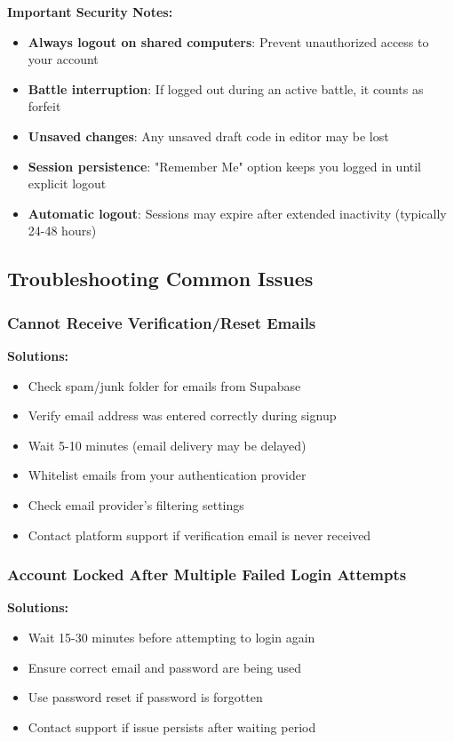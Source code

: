 \documentclass[12pt,a4paper]{article}
\begin{document}
\textbf{Important Security Notes:}
\begin{itemize}[leftmargin=*]
\item \textbf{Always logout on shared computers}: Prevent unauthorized access to your account
\item \textbf{Battle interruption}: If logged out during an active battle, it counts as forfeit
\item \textbf{Unsaved changes}: Any unsaved draft code in editor may be lost
\item \textbf{Session persistence}: "Remember Me" option keeps you logged in until explicit logout
\item \textbf{Automatic logout}: Sessions may expire after extended inactivity (typically 24-48 hours)
\end{itemize}

\FloatBarrier

\subsection{Troubleshooting Common Issues}

\subsubsection{Cannot Receive Verification/Reset Emails}

\textbf{Solutions:}
\begin{itemize}[leftmargin=*]
\item Check spam/junk folder for emails from Supabase
\item Verify email address was entered correctly during signup
\item Wait 5-10 minutes (email delivery may be delayed)
\item Whitelist emails from your authentication provider
\item Check email provider's filtering settings
\item Contact platform support if verification email is never received
\end{itemize}

\subsubsection{Account Locked After Multiple Failed Login Attempts}

\textbf{Solutions:}
\begin{itemize}[leftmargin=*]
\item Wait 15-30 minutes before attempting to login again
\item Ensure correct email and password are being used
\item Use password reset if password is forgotten
\item Contact support if issue persists after waiting period
\end{itemize}
\end{document}

